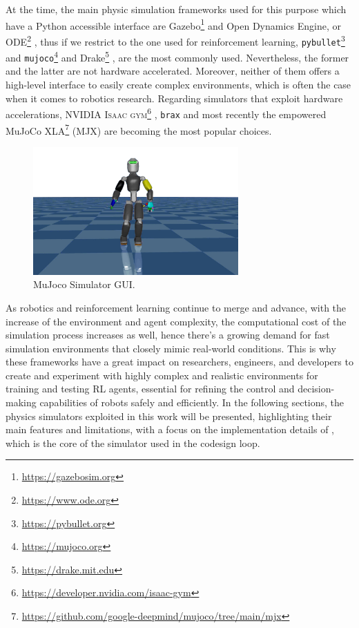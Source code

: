 At the time, the main physic simulation frameworks used for this purpose which have a Python accessible interface are Gazebo\footnote{\url{https://gazebosim.org}} \citep{koenig_design_2004} and Open Dynamics Engine, or ODE\footnote{\url{https://www.ode.org}}\citep{smith_open_2008} \citep{erez_simulation_2015,ivaldi_tools_2014}, thus if we restrict to the one used for reinforcement learning, \texttt{pybullet}\footnote{\url{https://pybullet.org}}\citep{coumans_pybullet_2016} and \texttt{mujoco}\footnote{\url{https://mujoco.org}}\citep{todorov_mujoco_2012} and Drake\footnote{\url{https://drake.mit.edu}}
\citep{tedrake_drake_2016}, are the most commonly used. Nevertheless, the former and the latter are not hardware accelerated. Moreover, neither of them offers a high-level interface to easily create complex environments, which is often the case when it comes to robotics research.
Regarding simulators that exploit hardware accelerations, NVIDIA \textsc{Isaac gym}\footnote{\url{https://developer.nvidia.com/isaac-gym}} \citep{makoviychuk_isaac_2021}, \texttt{brax} \citep{freeman_brax_2021} and most recently the \jax empowered MuJoCo XLA\footnote{\url{https://github.com/google-deepmind/mujoco/tree/main/mjx}} (MJX) are becoming the most popular choices.

\begin{figure}
    \centering
    \caption[MuJoCo Simulator GUI]{MuJoco Simulator \ac{GUI}.}
    \label{fig:mujoco}
    \includegraphics[width=0.7\textwidth]{Images/mujoco_ergocub.png}
\end{figure}

As robotics and reinforcement learning continue to merge and advance, with the increase of the environment and agent complexity, the computational cost of the simulation process increases as well, hence there's a growing demand for fast simulation environments that closely mimic real-world conditions. This is why these frameworks have a great impact on researchers, engineers, and developers to create and experiment with highly complex and realistic environments for training and testing \ac{RL} agents, essential for refining the control and decision-making capabilities of robots safely and efficiently. In the following sections, the physics simulators exploited in this work will be presented, highlighting their main features and limitations, with a focus on the implementation details of \jax, which is the core of the simulator used in the codesign loop.

